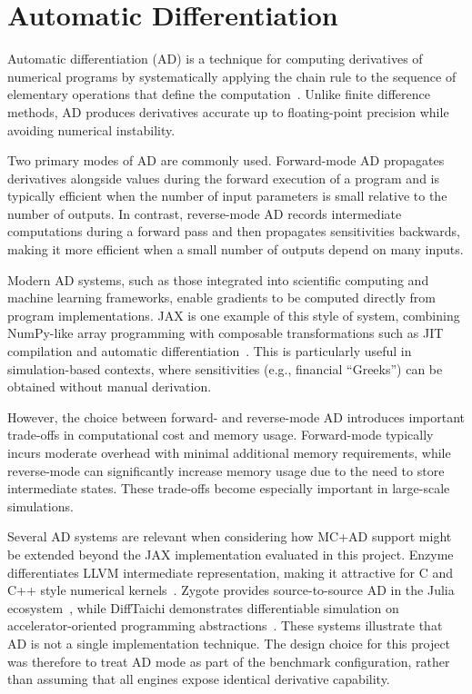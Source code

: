 \section{Automatic Differentiation}

Automatic differentiation (AD) is a technique for computing derivatives of numerical programs by systematically applying the chain rule to the sequence of elementary operations that define the computation~\cite{griewank2008,baydin2018}. Unlike finite difference methods, AD produces derivatives accurate up to floating-point precision while avoiding numerical instability.

Two primary modes of AD are commonly used. Forward-mode AD propagates derivatives alongside values during the forward execution of a program and is typically efficient when the number of input parameters is small relative to the number of outputs. In contrast, reverse-mode AD records intermediate computations during a forward pass and then propagates sensitivities backwards, making it more efficient when a small number of outputs depend on many inputs.

Modern AD systems, such as those integrated into scientific computing and machine learning frameworks, enable gradients to be computed directly from program implementations. JAX is one example of this style of system, combining NumPy-like array programming with composable transformations such as JIT compilation and automatic differentiation~\cite{jax2018}. This is particularly useful in simulation-based contexts, where sensitivities (e.g., financial ``Greeks'') can be obtained without manual derivation.

However, the choice between forward- and reverse-mode AD introduces important trade-offs in computational cost and memory usage. Forward-mode typically incurs moderate overhead with minimal additional memory requirements, while reverse-mode can significantly increase memory usage due to the need to store intermediate states. These trade-offs become especially important in large-scale simulations.

Several AD systems are relevant when considering how MC+AD support might be
extended beyond the JAX implementation evaluated in this project. Enzyme
differentiates LLVM intermediate representation, making it attractive for C and
C++ style numerical kernels~\cite{moses2021enzyme}. Zygote provides
source-to-source AD in the Julia ecosystem~\cite{innes2019zygote}, while
DiffTaichi demonstrates differentiable simulation on accelerator-oriented
programming abstractions~\cite{hu2020difftaichi}. These systems illustrate
that AD is not a single implementation technique. The design choice for this
project was therefore to treat AD mode as part of the benchmark configuration,
rather than assuming that all engines expose identical derivative capability.


